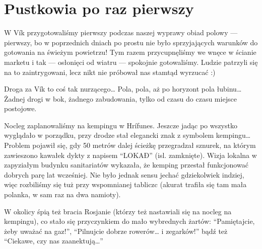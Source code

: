 \section*{Pustkowia po raz pierwszy}

W Vík przygotowaliśmy pierwszy podczas naszej wyprawy obiad polowy --- pierwszy, bo w poprzednich dniach po prostu nie było sprzyjających warunków do gotowania na świeżym powietrzu! Tym razem przycupnęliśmy we wnęce w ścianie marketu i tak --- osłonięci od wiatru --- spokojnie gotowaliśmy. Ludzie patrzyli się na to zaintrygowani, lecz nikt nie próbował nas stamtąd wyrzucać :)

Droga za Vík to coś tak nurzącego… Pola, pola, aż po horyzont pola łubinu…Żadnej drogi w bok, żadnego zabudowania, tylko od czasu do czasu miejsce postojowe.


Nocleg zaplanowaliśmy na kempingu w Hrífunes. Jeszcze jadąc po  wszystko wyglądało w porządku, przy drodze stał elegancki znak z symbolem kempingu… Problem pojawił się, gdy 50 metrów dalej ścieżkę przegradzał sznurek, na którym zawieszono kawałek dykty z napisem “LOKAÐ” (isl. zamknięte). Wizja lokalna w zapyziałym budynku sanitariatów wykazała, że kemping przestał funkcjonować dobrych parę lat wcześniej. Nie było jednak sensu jechać gdziekolwiek indziej, więc rozbiliśmy się tuż przy wspomnianej tabliczc (akurat trafiła się tam mała polanka, w sam raz na dwa namioty).

W okolicy śpią też bracia Rosjanie (którzy też nastawiali się na nocleg na kempingu), co stało się przyczynkiem do mało wybrednych żartów: “Pamiętajcie, żeby uważać na gaz!”, “Pilnujcie dobrze rowerów… i zegarków!” bądź też “Ciekawe, czy nas zaanektują…”